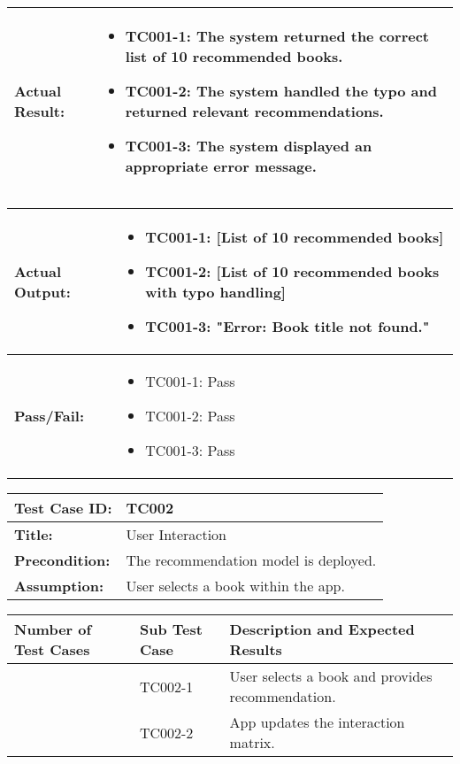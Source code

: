 \noindent
\begin{tabularx}{\textwidth}{|>{\raggedright\arraybackslash}p{4cm}|X|}
    \hline
    \textbf{Actual Result:} & 
    \begin{itemize}
        \item TC001-1: The system returned the correct list of 10 recommended books.
        \item TC001-2: The system handled the typo and returned relevant recommendations.
        \item TC001-3: The system displayed an appropriate error message.
    \end{itemize}
    \\ \hline
\end{tabularx}

\noindent
\begin{tabularx}{\textwidth}{|>{\raggedright\arraybackslash}p{4cm}|X|}
    \hline
    \textbf{Actual Output:} & 
    \begin{itemize}
        \item TC001-1: [List of 10 recommended books]
        \item TC001-2: [List of 10 recommended books with typo handling]
        \item TC001-3: "Error: Book title not found."
    \end{itemize}
    \\ \hline
    \textbf{Pass/Fail:} & 
    \begin{itemize}
        \item TC001-1: Pass
        \item TC001-2: Pass
        \item TC001-3: Pass
    \end{itemize}
    \\ \hline
\end{tabularx}

\noindent
\begin{tabularx}{\textwidth}{|>{\raggedright\arraybackslash}p{4cm}|X|}
    \hline
    \textbf{Test Case ID:} & TC002 \\ \hline
    \textbf{Title:} & User Interaction \\ \hline
    \textbf{Precondition:} & The recommendation model is deployed. \\ \hline
    \textbf{Assumption:} & User selects a book within the app. \\ \hline
\end{tabularx}

\noindent
\begin{tabularx}{\textwidth}{|>{\centering\arraybackslash}p{3cm}|>{\centering\arraybackslash}p{3cm}|X|}
    \hline
    \textbf{Number of Test Cases} & \textbf{Sub Test Case} & \textbf{Description and Expected Results} \\ \hline
    1 & TC002-1 & User selects a book and provides recommendation. \\ \hline
    2 & TC002-2 & App updates the interaction matrix. \\ \hline
\end{tabularx}

